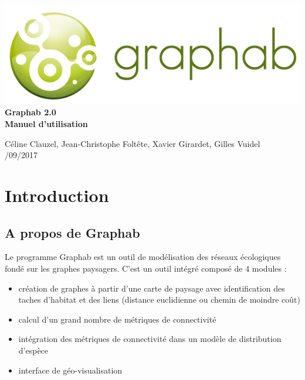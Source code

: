 \documentclass{article}
\begin{document}
 \begin{titlepage}
	
	\centering
	\includegraphics[scale=0.5]{img/logo.png}\\
	
	\bigskip
	\bigskip
	\bigskip	
	{\Huge
		\bfseries
		Graphab 2.0\\
		\bigskip
		Manuel d’utilisation\\
	}
	\bigskip
	\bigskip
	\bigskip
	\bigskip
	\bigskip
	
	{\Large		
		Céline Clauzel, Jean-Christophe Foltête, Xavier Girardet, Gilles Vuidel\\
		/09/2017\\
	}
	
\end{titlepage}

\setcounter{tocdepth}{2}
\tableofcontents

\pagebreak

\section{Introduction}

\subsection{A propos de Graphab}

Le programme Graphab est un outil de modélisation des réseaux écologiques fondé sur les graphes paysagers. C'est un outil intégré composé de 4 modules : 
\begin{itemize}
	\item création de graphes à partir d'une carte de paysage avec identification des taches d'habitat et des liens (distance euclidienne ou chemin de moindre coût)
	\item calcul d'un grand nombre de métriques de connectivité
	\item intégration des métriques de connectivité dans un modèle de distribution d’espèce
	\item interface de géo-visualisation
\end{itemize}
\end{document}
